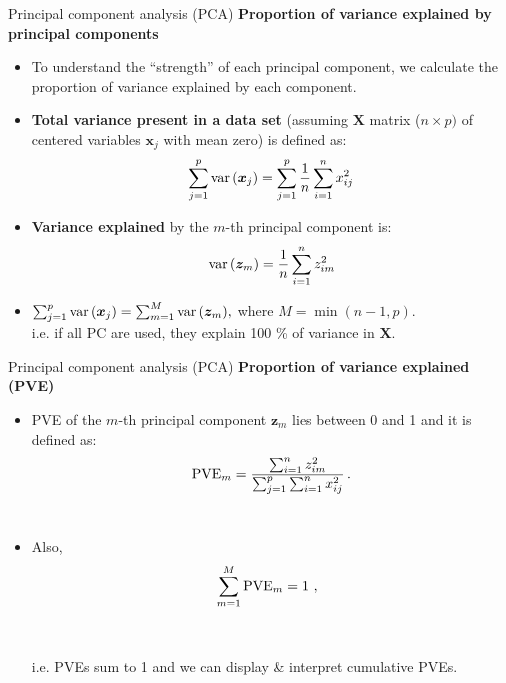 \documentclass{beamer}
\begin{document}
\begin{frame}{Principal component analysis (PCA)}
\textbf{Proportion of variance explained by principal components}\\
\begin{itemize}
\item To understand the ``strength'' of each principal component, we calculate the proportion of variance explained by each component.
\medskip
\item \textbf{Total variance present in a data set} (assuming $\bm{X}$ matrix ($n\!\times\!p)$ of centered variables $\bm{x}_j$ with mean zero) is defined as:
$$ \sum_{j=1}^p \textnormal{var}\,(\bm{x}_j) 
   = \sum_{j=1}^p \frac{1}{n} \sum_{i=1}^n x_{ij}^2 $$
\item \textbf{Variance explained} by the $m$-th principal component is:
$$ \textnormal{var}\,(\bm{z}_m) 
   = \frac{1}{n} \sum_{i=1}^n z_{im}^2 $$
\item $\sum_{j=1}^p \textnormal{var}\,(\bm{x}_j) = \sum_{m=1}^M \textnormal{var}\,(\bm{z}_m), $  where $M = \min(n-1, p)$. \\i.e. if all PC are used, they explain 100 \% of variance in $\bm{X}$.
\end{itemize}
\end{frame}
\begin{frame}{Principal component analysis (PCA)}
\textbf{Proportion of variance explained (PVE)}\\
\bigskip
\begin{itemize}
\item PVE of the $m$-th principal component $\bm{z}_m$ lies between 0 and 1 and it is defined as:
$$\textnormal{PVE}_m 
 = \frac{\sum_{i=1}^n z_{im}^2 }
 {\sum_{j=1}^p \sum_{i=1}^n x_{ij}^2}  \,.$$\\
\bigskip
\item Also, $$\sum_{m=1}^M \textnormal{PVE}_m = 1~,~~$$ \\~\\i.e. PVEs sum to 1 and we can display \& interpret cumulative PVEs.
\end{itemize}
\end{frame}
\end{document}
